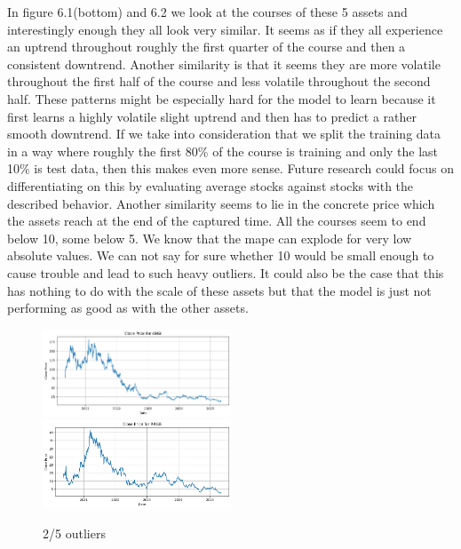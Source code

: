\documentclass[a4paper,12pt]{report}
\begin{document}
	

		In figure 6.1(bottom) and 6.2 we look at the courses of these 5 assets and interestingly enough they all look very similar. It seems as if they all experience an uptrend throughout roughly the first quarter of the course and then a consistent downtrend. Another similarity is that it seems they are more volatile throughout the first half of the course and less volatile throughout the second half. These patterns might be especially hard for the model to learn because it first learns a highly volatile slight uptrend and then has to predict a rather smooth downtrend. If we take into consideration that we split the training data in a way where roughly the first 80\% of the course is training and only the last 10\% is test data, then this makes even more sense. Future research could focus on differentiating on this by evaluating average stocks against stocks with the described behavior. Another similarity seems to lie in the concrete price which the assets reach at the end of the captured time. All the courses seem to end below 10, some below 5. We know that the mape can explode for very low absolute values. We can not say for sure whether 10 would be small enough to cause trouble and lead to such heavy outliers. It could also be the case that this has nothing to do with the scale of these assets but that the model is just not performing as good as with the other assets. 
		
\begin{figure}
  \includegraphics[width=0.5\textwidth]{images/outlier4.png}
  \includegraphics[width=0.5\textwidth]{images/outlier5.png}
  \caption{2/5 outliers}
  \label{fig:wrapped}
\end{figure}
\end{document}
